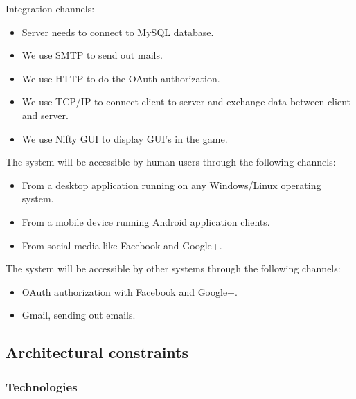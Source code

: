 \documentclass[letterpaper]{article}
\begin{document}
				\hspace{5mm}Integration channels:
					\begin{itemize}
						\item Server needs to connect to MySQL database.
						\item We use SMTP to send out mails.
						\item We use HTTP to do the OAuth authorization.
						\item We use TCP/IP to connect client to server and exchange data between client and server.
						\item We use Nifty GUI to display GUI's in the game.
					\end{itemize}
				
				\vspace{0.1in}				
				
				The system will be accessible by human users through the following channels:
				\begin{itemize}
					\item From a desktop application running on any Windows/Linux operating system.
					\item From a mobile device running Android application clients.
					\item From social media like Facebook and Google+.
				\end{itemize}
				
				The system will be accessible by other systems through the following channels:
				\begin{itemize}
					\item OAuth authorization with Facebook and Google+.
					\item Gmail, sending out emails.
				\end{itemize}
				
			\vspace{0.2in}
			\subsection*{ Architectural constraints }
			\vspace{0.1in}
					\vspace{0.1in}
		
			\subsubsection*{Technologies}
			\vspace{0.1in}
			
\end{document}
